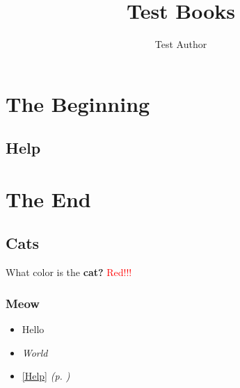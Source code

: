 \documentclass[12pt, openany]{book}
\begin{document}
\title{Test Books}
\author{Test Author}
\date{ }
\maketitle
\tableofcontents
\part{The Beginning}
\chapter{Help}
\label{Help}
\part{The End}
\chapter{Cats}
What color is the \textbf{cat?}
\textcolor{red}{Red!!!}
\section{Meow}
\begin{itemize}
\item{Hello}
\item{\textit{World}}
\item{\autoref{Help} \textit{(p. \pageref{Help} )}}
\end{itemize}
\end{document}
